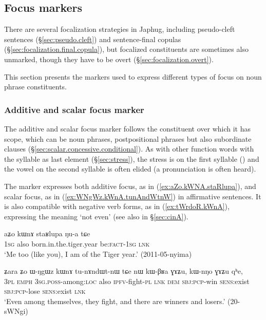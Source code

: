  \subsection{Focus markers} \label{sec:focus}
There are several focalization strategies in Japhug, including pseudo-cleft sentences (§\ref{sec:pseudo.cleft}) and sentence-final copulas (§\ref{sec:focalization.final.copula}), but focalized constituents are sometimes also unmarked, though they have to be overt (§\ref{sec:focalization.overt}).

This section presents the markers used to express different types of focus on noun phrase constituents.


 \subsubsection{Additive and scalar focus marker  } \label{sec:kWnA}
The additive and scalar focus marker  follows the constituent over which it has scope, which can be noun phrases, postpositional phrases but also subordinate clauses (§\ref{sec:scalar.concessive.conditional}). As with other function words with the syllable  as last element (§\ref{sec:stress}), the stress is on the first syllable () and the vowel on the second syllable is often elided (a pronunciation  is often heard). 

The marker  expresses both additive focus, as in (\ref{ex:aZo.kWNA.staRlupa}), and scalar focus, as in (\ref{ex:WNgWz.kWnA.tunAndWtnW}) in affirmative sentences. It is also compatible with negative verb forms, as in (\ref{ex:tWrdoR.kWnA}), expressing the meaning `not even' (see also  in §\ref{sec:cinA}).

\begin{exe}
\ex \label{ex:aZo.kWNA.staRlupa}
\gll aʑo kɯnɤ staʁlupa ŋu-a tɕe \\
\textsc{1sg} also born.in.the.tiger.year be:\textsc{fact}-\textsc{1sg} \textsc{lnk} \\
\glt `Me too (like you), I am of the Tiger year.' (2011-05-nyima)
\end{exe}

\begin{exe}
\ex \label{ex:WNgWz.kWnA.tunAndWtnW}
\gll ʑara ʑo ɯ-ŋgɯz kɯnɤ tu-nɤndɯt-nɯ tɕe nɯ kɯ-βʁa ɣɤʑu, kɯ-nŋo ɣɤʑu qʰe, \\
\textsc{3pl} \textsc{emph} \textsc{3sg}.\textsc{poss}-among:\textsc{loc} also \textsc{ipfv}-fight-\textsc{pl} \textsc{lnk} \textsc{dem} \textsc{sbj}:\textsc{pcp}-win \textsc{sens}:exist \textsc{sbj}:\textsc{pcp}-lose  \textsc{sens}:exist \textsc{lnk} \\
\glt `Even among themselves, they fight, and there are winners and losers.' (20-sWNgi)
\end{exe}
 
